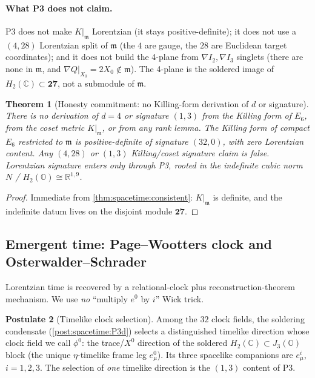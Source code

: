 \documentclass[11pt]{article}
\theoremstyle{plain}
\newtheorem{theorem}{Theorem}[section]
\theoremstyle{definition}
\newtheorem{postulate}[theorem]{Postulate}
\theoremstyle{remark}
\begin{document}
\paragraph{What P3 does not claim.}
P3 does not make $K|_{\mathfrak m}$ Lorentzian (it stays positive-definite); it does not
use a $(4,28)$ Lorentzian split of $\mathfrak m$ (the $4$ are gauge, the $28$ are
Euclidean target coordinates); and it does not build the 4-plane from $\nabla I_2,
\nabla I_3$ singlets (there are none in $\mathfrak m$, and $\nabla Q|_{X_0}=2X_0\notin\mathfrak m$).
The 4-plane is the soldered image of $H_2(\mathbb C)\subset\mathbf{27}$, not a submodule
of $\mathfrak m$.

\begin{theorem}[Honesty commitment: no Killing-form derivation of $d$ or signature]
\label{thm:spacetime:antikilling}
There is no derivation of $d=4$ or signature $(1,3)$ from the Killing form of $E_6$,
from the coset metric $K|_{\mathfrak m}$, or from any rank lemma. The Killing form of
compact $E_6$ restricted to $\mathfrak m$ is positive-definite of signature $(32,0)$,
with zero Lorentzian content. Any $(4,28)$ or $(1,3)$ Killing/coset signature claim is
false. Lorentzian signature enters \emph{only} through P3, rooted in the indefinite
cubic norm $N$ / $H_2(\mathbb O)\cong\mathbb R^{1,9}$.
\end{theorem}
\begin{proof}
Immediate from \autoref{thm:spacetime:consistent}: $K|_{\mathfrak m}$ is definite, and
the indefinite datum lives on the disjoint module $\mathbf{27}$.
\end{proof}

\subsection{Emergent time: Page--Wootters clock and Osterwalder--Schrader}
\label{sec:spacetime:time}
\label{sec:time:main}
\label{sec:soldering:os}

Lorentzian time is recovered by a relational-clock plus reconstruction-theorem
mechanism. We use \emph{no} ``multiply $e^0$ by $i$'' Wick trick.

\begin{postulate}[Timelike clock selection]\label{post:spacetime:clock}
Among the $32$ clock fields, the soldering condensate
(\autoref{post:spacetime:P3d}) selects a distinguished timelike direction whose clock
field we call $\phi^0$: the trace/$X^0$ direction of the soldered
$H_2(\mathbb C)\subset J_3(\mathbb O)$ block (the unique $\eta$-timelike frame leg
$e^0_\mu$). Its three spacelike companions are $e^i_\mu$, $i=1,2,3$. The selection of
\emph{one} timelike direction is the $(1,3)$ content of P3.
\end{postulate}
\end{document}
